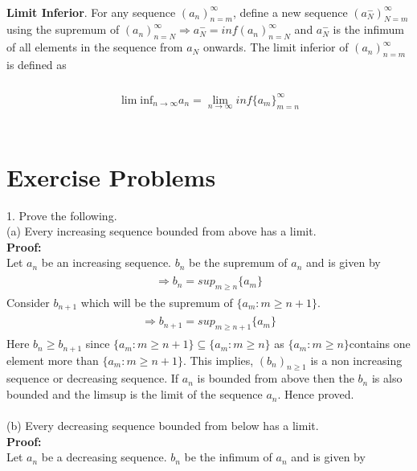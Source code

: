\documentclass[a4paper]{article}
\begin{document}
	\\
\textbf{Limit Inferior}.
For any sequence $(a_n)^\infty_{n=m}$, define a new sequence $(a_N^-)^\infty_{N=m}$ using the supremum of  $(a_n)^\infty_{n=N} \Rightarrow a_N^- = inf (a_n)^\infty_{n=N}$ and $a_N^-$ is the infimum of all elements in the sequence from $a_N$ onwards. The limit inferior of $(a_n)^\infty_{n=m}$ is defined as 
	\\
	\\
	\begin{align}
	\begin{split}
	\lim\text{inf}_{n \to \infty} a_n = \lim_{n \to \infty} inf \{a_m\}^\infty_{m=n}
	\end{split}
	\end{align}
\\
\section{Exercise Problems}
1. Prove the following.\\
	(a) Every increasing sequence bounded from	above has a limit.\\
\textbf{Proof:}\\
Let $a_n$ be an increasing sequence. $b_n$ be the supremum of $a_n$ and is given by\\
\begin{align}
\begin{split}
\Rightarrow b_n = sup_{m\geq n} \{a_m\}
\end{split}
\end{align}
Consider $b_{n+1}$ which will be the supremum of $\{a_m:m\geq n+1\}$.
\begin{align}
\begin{split}
\Rightarrow b_{n+1} = sup_{m\geq n+1} \{a_m\}
\end{split}
\end{align}
Here $b_n \geq b_{n+1}$ since $\{a_m:m\geq n+1\} \subseteq \{a_m:m\geq n\}$ as $\{a_m:m\geq n\}$contains one element more than $\{a_m:m\geq n+1\}$. This implies, $(b_n)_{n\geq 1}$ is a non increasing sequence or decreasing sequence. If $a_n$ is bounded from above then the $b_n$ is also bounded and the limsup is the limit of the sequence $a_n$. Hence proved.
\\
\\
(b) Every decreasing sequence bounded from below has a limit.\\
\textbf{Proof:}\\
Let $a_n$ be a decreasing sequence. $b_n$ be the infimum of $a_n$ and is given by\\
\end{document}
